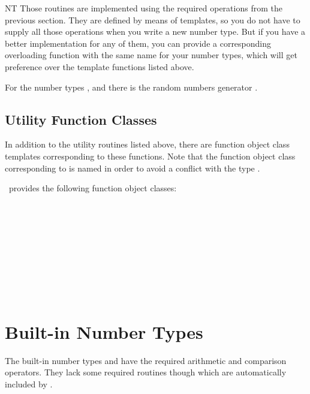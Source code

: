 \begin{ccClass} {NT}
Those routines are implemented using the required operations from the
previous section. They are defined by means of templates, so you do not
have to supply all those operations when you write  a new number type.
But if you have a better implementation for any of them, you can provide a 
corresponding overloading function with the same name for your number types,
which will get preference over the template functions listed above.

For the number types , and  there is
the random numbers generator .




\end{ccClass} 

\subsection{Utility Function Classes}
In addition to the utility routines listed above, 
there are function object class templates corresponding to these functions.
Note that the function object class corresponding to  is
named  in order to avoid a conflict with the type 
.

\cgal\ provides the following function object classes:


\\
\\
\\
\\
\\
\\
\\
\\

\section{Built-in Number Types}

The built-in number types  and  have the
required arithmetic and comparison operators. They lack some required
routines though which are automatically included by \cgal.


